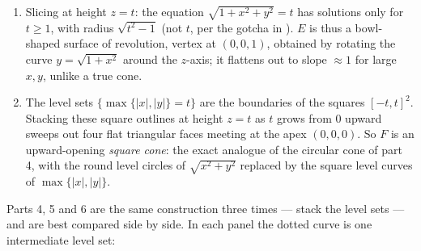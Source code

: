 \begin{exercisesolution}
\begin{enumerate}[label=\textbf{\arabic*.}]
  \item Slicing at height $z=t$: the equation $\sqrt{1+x^2+y^2}=t$ has solutions only for
    $t \geq 1$, with radius $\sqrt{t^2-1}$ (not $t$, per the gotcha in
    ). $E$ is thus a bowl-shaped surface of revolution, vertex at
    $(0,0,1)$, obtained by rotating the curve $y = \sqrt{1+x^2}$ around the $z$-axis; it flattens
    out to slope $\approx 1$ for large $x,y$, unlike a true cone.
  \item The level sets $\{\max\{|x|,|y|\}=t\}$ are the boundaries of the squares $[-t,t]^2$.
    Stacking these square outlines at height $z=t$ as $t$ grows from $0$ upward sweeps out four
    flat triangular faces meeting at the apex $(0,0,0)$. So $F$ is an upward-opening
    \emph{square cone}: the exact analogue of the circular cone of part 4, with the round level
    circles of $\sqrt{x^2+y^2}$ replaced by the square level curves of $\max\{|x|,|y|\}$.
\end{enumerate}

Parts 4, 5 and 6 are the same construction three times --- stack the level sets --- and are
best compared side by side. In each panel the dotted curve is one intermediate level set:

\begin{center}
\end{center}
\end{exercisesolution}

